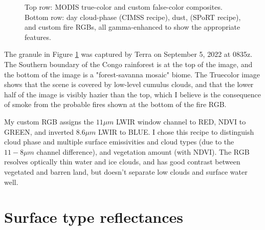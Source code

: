 \documentclass[12pt]{article}
\begin{document}
\begin{figure}[h!]
\begin{center}
{        }
    \end{center}

    \caption{Top row: MODIS true-color and custom false-color composites. Bottom row: day cloud-phase (CIMSS recipe), dust, (SPoRT recipe), and custom fire RGBs, all gamma-enhanced to show the appropriate features.}
    \label{q4_rgbs}
\end{figure}

The granule in Figure \ref{q4_rgbs} was captured by Terra on September 5, 2022 at 0835z. The Southern boundary of the Congo rainforest is at the top of the image, and the bottom of the image is a "forest-savanna mosaic" biome.  The Truecolor image shows that the scene is covered by low-level cumulus clouds, and that the lower half of the image is visibly hazier than the top, which I believe is the consequence of smoke from the probable fires shown at the bottom of the fire RGB.

My custom RGB assigns the $11\mu m$ LWIR window channel to RED, NDVI to GREEN, and inverted $8.6\mu m$ LWIR to BLUE. I chose this recipe to distinguish cloud phase and multiple surface emissivities and cloud types (due to the $11-8\mu m$ channel difference), and vegetation amount (with NDVI). The RGB resolves optically thin water and ice clouds, and has good contrast between vegetated and barren land, but doesn't separate low clouds and surface water well.

\clearpage

\section{Surface type reflectances}
\end{document}
